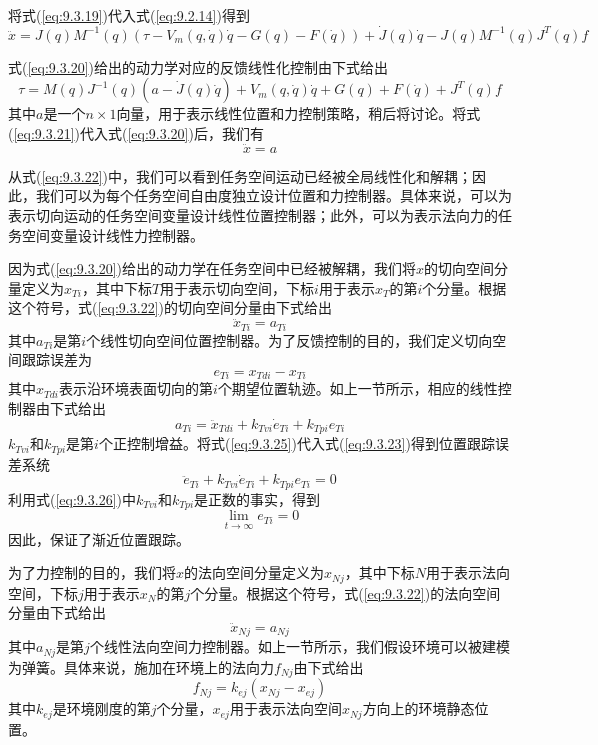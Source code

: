 \documentclass[12pt,a4paper]{ctexart}
\begin{document}
将式(\ref{eq:9.3.19})代入式(\ref{eq:9.2.14})得到
\begin{equation}\label{eq:9.3.20}
\ddot{x} = J(q)M^{-1}(q)(\tau - V_m(q, \dot{q})\dot{q} - G(q) - F(\dot{q})) + \dot{J}(q)\dot{q} - J(q)M^{-1}(q)J^T(q)f
\end{equation}

式(\ref{eq:9.3.20})给出的动力学对应的反馈线性化控制由下式给出
\begin{equation}\label{eq:9.3.21}
\tau = M(q)J^{-1}(q)(a - \dot{J}(q)\dot{q}) + V_m(q, \dot{q})\dot{q} + G(q) + F(\dot{q}) + J^T(q)f
\end{equation}
其中$a$是一个$n \times 1$向量，用于表示线性位置和力控制策略，稍后将讨论。将式(\ref{eq:9.3.21})代入式(\ref{eq:9.3.20})后，我们有
\begin{equation}\label{eq:9.3.22}
\ddot{x} = a
\end{equation}

从式(\ref{eq:9.3.22})中，我们可以看到任务空间运动已经被全局线性化和解耦；因此，我们可以为每个任务空间自由度独立设计位置和力控制器。具体来说，可以为表示切向运动的任务空间变量设计线性位置控制器；此外，可以为表示法向力的任务空间变量设计线性力控制器。

因为式(\ref{eq:9.3.20})给出的动力学在任务空间中已经被解耦，我们将$x$的切向空间分量定义为$x_{Ti}$，其中下标$T$用于表示切向空间，下标$i$用于表示$x_T$的第$i$个分量。根据这个符号，式(\ref{eq:9.3.22})的切向空间分量由下式给出
\begin{equation}\label{eq:9.3.23}
\ddot{x}_{Ti} = a_{Ti}
\end{equation}
其中$a_{Ti}$是第$i$个线性切向空间位置控制器。为了反馈控制的目的，我们定义切向空间跟踪误差为
\begin{equation}\label{eq:9.3.24}
e_{Ti} = x_{Tdi} - x_{Ti}
\end{equation}
其中$x_{Tdi}$表示沿环境表面切向的第$i$个期望位置轨迹。如上一节所示，相应的线性控制器由下式给出
\begin{equation}\label{eq:9.3.25}
a_{Ti} = \ddot{x}_{Tdi} + k_{Tvi}\dot{e}_{Ti} + k_{Tpi}e_{Ti}
\end{equation}
$k_{Tvi}$和$k_{Tpi}$是第$i$个正控制增益。将式(\ref{eq:9.3.25})代入式(\ref{eq:9.3.23})得到位置跟踪误差系统
\begin{equation}\label{eq:9.3.26}
\ddot{e}_{Ti} + k_{Tvi}\dot{e}_{Ti} + k_{Tpi}e_{Ti} = 0
\end{equation}
利用式(\ref{eq:9.3.26})中$k_{Tvi}$和$k_{Tpi}$是正数的事实，得到
\[
\lim_{t \to \infty} e_{Ti} = 0
\]
因此，保证了渐近位置跟踪。

为了力控制的目的，我们将$x$的法向空间分量定义为$x_{Nj}$，其中下标$N$用于表示法向空间，下标$j$用于表示$x_N$的第$j$个分量。根据这个符号，式(\ref{eq:9.3.22})的法向空间分量由下式给出
\begin{equation}\label{eq:9.3.27}
\ddot{x}_{Nj} = a_{Nj}
\end{equation}
其中$a_{Nj}$是第$j$个线性法向空间力控制器。如上一节所示，我们假设环境可以被建模为弹簧。具体来说，施加在环境上的法向力$f_{Nj}$由下式给出
\begin{equation}\label{eq:9.3.28}
f_{Nj} = k_{ej}(x_{Nj} - x_{ej})
\end{equation}
其中$k_{ej}$是环境刚度的第$j$个分量，$x_{ej}$用于表示法向空间$x_{Nj}$方向上的环境静态位置。
\end{document}
